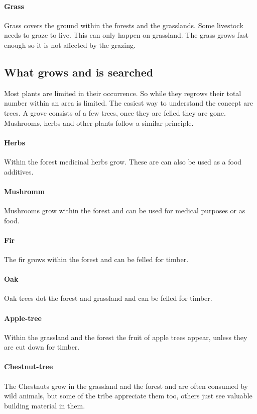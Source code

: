 \paragraph{Grass}
Grass covers the ground within the forests and the grasslands. Some livestock
needs to graze to live. This can only happen on grassland. The grass grows fast
enough so it is not affected by the grazing.

\subsection{What grows and is searched}\label{ch:Goods:Nature:Plants:Limited}
Most plants are limited in their occurrence. So while they regrows their total
number within an area is limited. The easiest way to understand the concept are
trees. A grove consists of a few trees, once they are felled they are gone.
Mushrooms, herbs and other plants follow a similar principle.

\paragraph{Herbs}
Within the forest medicinal herbs grow. These are can also be used as a food
additives.

\paragraph{Mushromm}
Mushrooms grow within the forest and can be used for medical purposes or as
food.

\paragraph{Fir}
The fir grows within the forest and can be felled for timber.

\paragraph{Oak}
Oak trees dot the forest and grassland and can be felled for timber.

\paragraph{Apple-tree}
Within the grassland and the forest the fruit of apple trees appear, unless
they are cut down for timber.

\paragraph{Chestnut-tree}
The Chestnuts grow in the grassland and the forest and are often consumed by
wild animals, but some of the tribe appreciate them too, others just see
valuable building material in them.


